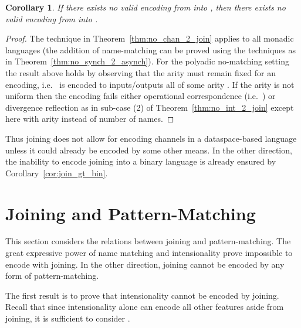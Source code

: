 \documentclass[submission,copyright,creativecommons]{eptcs}
\newtheorem{corollary}[theorem]{Corollary}
\begin{document}
\begin{corollary}
If there exists no valid encoding from
 into , then there exists
no valid encoding from  into .
\end{corollary}
\begin{proof}
The technique in Theorem~\ref{thm:no_chan_2_join} applies to all monadic languages
(the addition of name-matching can be proved using the techniques as in Theorem~\ref{thm:no_synch_2_asynch}).
For the polyadic no-matching setting the result above holds by observing that the arity must
remain fixed for an encoding, i.e.~ is\linebreak
encoded to inputs/outputs all of
some arity . If the arity is not uniform then the encoding fails\linebreak
either operational correspondence
(i.e.~)
or divergence reflection as in sub-case (2) of Theorem~\ref{thm:no_int_2_join} except here with
arity instead of number of names.
\end{proof}

Thus joining does not allow for encoding channels in a dataspace-based language unless it could already be
encoded by some other means.
In the other direction, the inability to encode joining into a binary language is already 
ensured by Corollary~\ref{cor:join_gt_bin}.


\section{Joining and Pattern-Matching}
\label{sec:join_pattern}

This section considers the relations between joining and pattern-matching.
The great expressive power of name matching \cite{G:IC08} and intensionality \cite{givenwilson:hal-01026301}
prove impossible to encode with joining.
In the other direction, joining cannot be encoded by any form of pattern-matching.

The first result is to prove that intensionality cannot be encoded by joining.
Recall that since intensionality alone can encode all other features aside from joining,
it is sufficient to consider .
\end{document}

